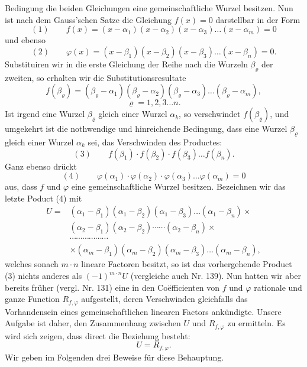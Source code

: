 Bedingung die beiden Gleichungen eine gemeinschaftliche Wurzel besitzen.
Nun ist nach dem Gauss'schen Satze die Gleichung $f(x) = 0$ darstellbar
in der Form
\[
(1) \qquad f(x) = (x - \alpha_1)(x - \alpha_2)(x - \alpha_3) \ldots (x - \alpha_m) = 0
\]
und ebenso
\[
(2) \qquad \varphi(x) = (x - \beta_1)(x - \beta_2)(x - \beta_3) \ldots (x - \beta_n) = 0.
\]
Substituiren wir in die erste Gleichung der Reihe nach die Wurzeln
$\beta_\varrho$ der zweiten, so erhalten wir die Substitutionsresultate
\[
f(\beta_\varrho) = (\beta_\varrho - \alpha_1)(\beta_\varrho - \alpha_2)(\beta_\varrho - \alpha_3) \ldots (\beta_\varrho - \alpha_m),
\]
\[
\varrho = 1, 2, 3 \ldots n.
\]
Ist irgend eine Wurzel $\beta_\varrho$ gleich einer Wurzel $\alpha_k$, so
verschwindet $f(\beta_\varrho)$, und umgekehrt ist die nothwendige und
hinreichende Bedingung, dass eine Wurzel $\beta_\varrho$ gleich einer
Wurzel $\alpha_k$ sei, das Verschwinden des Productes:
\[
(3) \qquad f(\beta_1) \cdot f(\beta_2) \cdot f(\beta_3) \ldots f(\beta_n).
\]
Ganz ebenso drückt
\[
(4) \qquad \varphi(\alpha_1) \cdot \varphi(\alpha_2) \cdot \varphi(\alpha_3) \ldots \varphi(\alpha_m) = 0
\]
aus, dass $f$ und $\varphi$ eine gemeinschaftliche Wurzel besitzen.
Bezeichnen wir das letzte Poduct (4) mit %
\[
\begin{aligned}
U = {}& (\alpha_1 - \beta_1)(\alpha_1 - \beta_2)(\alpha_1 - \beta_3) \ldots (\alpha_1 - \beta_n) \times \\
& (\alpha_2 - \beta_1)(\alpha_2 - \beta_2) \cdots\cdots (\alpha_2 - \beta_n) \times \\
& \cdots\cdots\cdots\cdots\cdots\cdots \\
& \times (\alpha_m - \beta_1)(\alpha_m - \beta_2)(\alpha_m - \beta_3) \ldots (\alpha_m - \beta_n),
\end{aligned}
\]
welches sonach $m \cdot n$ lineare Factoren besitzt, so ist das
vorhergehende Product (3) nichts anderes als $(-1)^{m \cdot n} U$
(vergleiche auch Nr. 139). Nun hatten wir aber bereits früher (vergl.
Nr. 131) eine in den Coëfficienten von $f$ und $\varphi$ rationale und
ganze Function $R_{f,\varphi}$ aufgestellt, deren Verschwinden gleichfalls
das Vorhandensein eines gemeinschaftlichen linearen Factors ankündigte.
Unsere Aufgabe ist daher, den Zusammenhang zwischen $U$ und $R_{f,\varphi}$
zu ermitteln. Es wird sich zeigen, dass direct die Beziehung besteht:
\[
U = R_{f,\varphi}.
\]
Wir geben im Folgenden drei Beweise für diese Behauptung.

